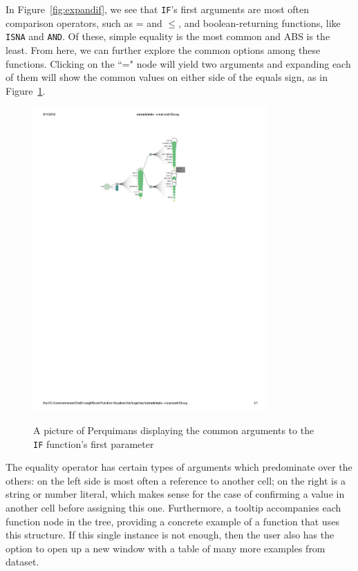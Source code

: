 \documentclass[conference]{IEEEtran}
\newcommand{\toolname}{Perquimans\xspace} \newcommand{\toolnameend}{Perquimans}
\begin{document}
	In Figure~\ref{fig:expandif}, we see that \texttt{IF}'s first arguments are most often comparison operators,
	such as = and $\le$, and boolean-returning functions, like \texttt{ISNA} and \texttt{AND}. Of these,
	simple equality is the most common and ABS is the least. From here, we
	can further explore the common options among these functions. Clicking on the
	``=" node will yield two arguments and expanding each of them will show
	the common values on either side of the equals sign, as in Figure~\ref{fig:fullpic}. 
	
	\begin{figure}[t] \centering \includegraphics[width=0.8\textwidth]{IFargslabel}
		\caption{A picture of \toolname displaying the common arguments to the \texttt{IF}
			function's first parameter} \centering \label{fig:fullpic} \end{figure}
	
	The equality operator has certain types of arguments
	which predominate over the others: on the left side is most often a reference
	to another cell; on the right is a string or number literal, which makes sense
	for the case of confirming a value in another cell before assigning this one.
	Furthermore, a tooltip accompanies each function node in the tree, providing a
	concrete example of a function that uses this structure. If this single
	instance is not enough, then the user also has the option to open up a new
	window with a table of many more examples from dataset.
	
\end{document}
